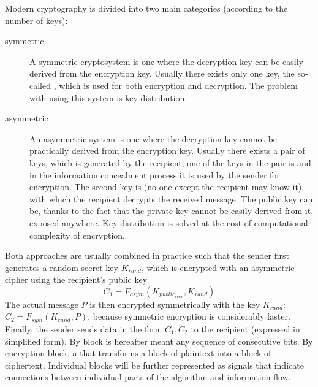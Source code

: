 
Modern cryptography is divided into two main categories (according to the number of keys):
\begin{description}
  \item[symmetric] A symmetric cryptosystem is one
    where the decryption key can be easily derived from the encryption key.
    Usually there exists only one key, the so-called ,
    which is used for both encryption and decryption. The problem with using
    this system is key distribution.
  \item[asymmetric] An asymmetric system is one where the decryption
  key cannot be practically derived from the encryption key.
  Usually there exists a pair of keys, which is generated by the recipient, one of the keys in the pair is
   and in the information concealment process it is used by the sender for encryption.
  The second key is  (no one except the recipient may know it),
  with which the recipient decrypts the received message. The public key can be, thanks to the fact that
  the private key cannot be easily derived from it, exposed anywhere.
  Key distribution is solved at the cost of
  computational complexity of encryption.
\end{description}
Both approaches are usually combined in practice such that
the sender first generates a random secret key $K_{rand}$,
which is encrypted with an asymmetric cipher using the recipient's public key
$$C_1 = F_{asym}(K_{public_{recv}}, K_{rand})$$
The actual message $P$ is then encrypted symmetrically with the key $K_{rand}$:
$C_2 = F_{sym}(K_{rand}, P)$, because symmetric encryption is considerably faster.
Finally, the sender sends data in the form $C_1, C_2$ to the recipient (expressed in simplified form).
By block is hereafter meant any sequence of consecutive bits.
By encryption block, a  that transforms a block of plaintext into a block of ciphertext.
Individual blocks will be further represented as signals that
indicate connections between individual parts of the algorithm and information flow.

